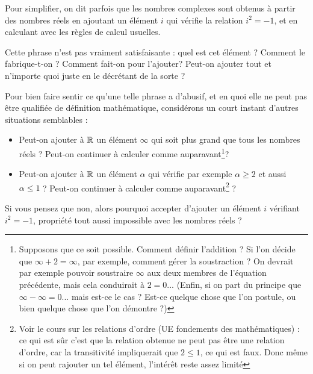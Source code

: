 Pour simplifier, on dit parfois que les nombres complexes sont obtenus à partir des nombres réels en \og ajoutant un élément $i$ qui vérifie la relation $i^2=-1$, et en calculant avec les règles de calcul usuelles\fg.

Cette phrase n'est pas vraiment satisfaisante : quel est cet élément ? Comment le fabrique-t-on ? Comment fait-on pour \og l'ajouter\fg ? Peut-on ajouter tout et n'importe quoi juste en le décrétant de la sorte ?

Pour bien faire sentir ce qu'une telle phrase a d'abusif, et en quoi elle ne peut pas être qualifiée de définition mathématique, considérons un court instant d'autres situations semblables : 
\begin{itemize}
\item Peut-on ajouter à $\mathbb{R}$ un élément \og$\infty$\fg{} qui soit plus grand que tous les nombres réels ? Peut-on continuer à calculer comme auparavant\footnote{Supposons que ce soit possible. Comment définir l'addition ? Si l'on décide que $\infty+2=\infty$, par exemple, comment gérer la soustraction ? On devrait par exemple pouvoir soustraire $\infty$ aux deux membres de l'équation précédente, mais cela conduirait à $2=0$... (Enfin, si on part du principe que $\infty-\infty=0$... mais est-ce le cas ? Est-ce quelque chose que l'on postule, ou bien quelque chose que l'on démontre ?) }?
\item Peut-on ajouter à $\mathbb{R}$ un élément $\alpha$ qui vérifie par exemple $\alpha\geq 2$ et aussi $\alpha\leq 1$ ? Peut-on continuer à calculer comme auparavant\footnote{Voir le cours sur les relations d'ordre (UE \og fondements des mathématiques\fg) : ce qui est sûr c'est que la relation obtenue ne peut pas être une relation d'ordre, car la transitivité impliquerait que $2\leq 1$, ce qui est faux. Donc même si on peut rajouter un tel élément, l'intérêt reste assez limité} ?
\end{itemize}

Si vous pensez que non, alors pourquoi accepter d'ajouter un élément $i$ vérifiant $i^2=-1$, propriété tout aussi impossible avec les nombres réels ?


